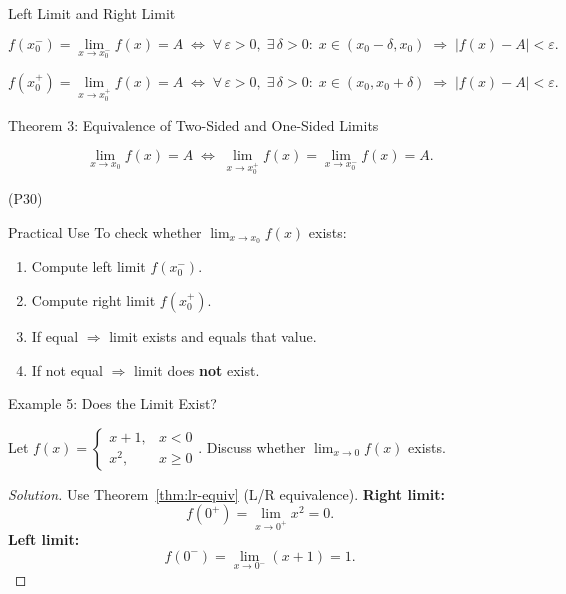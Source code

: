 \documentclass[aspectratio=169,10pt]{beamer}
\begin{document}
\begin{frame}{Left Limit and Right Limit}
  \begin{definition}
    \[
      f(x_0^-)=\lim_{x\to x_0^-}f(x)=A
      \;\Longleftrightarrow\;
      \forall\,\varepsilon>0,\;\exists\,\delta>0:\;
      x\in(x_0-\delta,x_0) \;\Longrightarrow\; |f(x)-A|<\varepsilon.
    \]
  \end{definition}
  \pause
  \begin{definition}
    \[
      f(x_0^+)=\lim_{x\to x_0^+}f(x)=A
      \;\Longleftrightarrow\;
      \forall\,\varepsilon>0,\;\exists\,\delta>0:\;
      x\in(x_0,x_0+\delta) \;\Longrightarrow\; |f(x)-A|<\varepsilon.
    \]
  \end{definition}
\end{frame}

\begin{frame}{Theorem 3: Equivalence of Two-Sided and One-Sided Limits}
  \begin{theorem}[L/R Equivalence]\label{thm:lr-equiv}
    \[
      \lim_{x\to x_0}f(x)=A
      \;\Longleftrightarrow\;
      \lim_{x\to x_0^+}f(x)=\lim_{x\to x_0^-}f(x)=A.
    \]
  \end{theorem}
  \hfill(P30)
  \vspace{1em}
  \pause
  \begin{block}{Practical Use}
    To check whether $\displaystyle\lim_{x\to x_0}f(x)$ exists:
    \begin{enumerate}
      \item Compute left limit $f(x_0^-)$.
      \item Compute right limit $f(x_0^+)$.
      \item If equal $\Rightarrow$ limit exists and equals that value.
      \item If not equal $\Rightarrow$ limit does \textbf{not} exist.
    \end{enumerate}
  \end{block}
\end{frame}

\begin{frame}{Example 5: Does the Limit Exist?}
  \begin{example}
    Let $f(x)=\begin{cases} x+1, & x<0 \\ x^2, & x\geq 0 \end{cases}$.
    Discuss whether $\displaystyle\lim_{x\to 0}f(x)$ exists.
  \end{example}
  \pause
  \begin{proof}[Solution]
    Use Theorem~\ref{thm:lr-equiv} (L/R equivalence).
    \pause
    \textbf{Right limit:}
    \[
      f(0^+) = \lim_{x\to 0^+}x^2 = 0.
    \]
    \pause
    \textbf{Left limit:}
    \[
      f(0^-) = \lim_{x\to 0^-}(x+1) = 1.
    \]
  \end{proof}
\end{frame}
\end{document}
